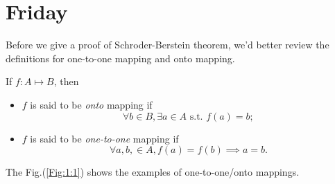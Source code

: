 
\section{Friday}
Before we give a proof of Schroder-Berstein theorem, we'd better review the definitions for one-to-one mapping and onto mapping. 
\begin{definition}
If $f:A\mapsto B$, then 
\begin{itemize}
\item
$f$ is said to be \emph{onto} mapping if
\[
\forall b\in B,\exists a\in A\mbox{ s.t. }f(a)=b;
\]
\item
$f$ is said to be \emph{one-to-one} mapping if
\[
\forall a,b,\in A, f(a)=f(b)\implies a=b.
\]
\end{itemize}
\end{definition}
The Fig.(\ref{Fig:1:1}) shows the examples of one-to-one/onto mappings.
